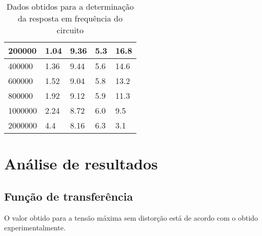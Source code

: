 \documentclass[%
  reprint,
  nofootinbib,
  amsmath,amssymb,
  aps,
  10pt,
  a4paper
]{revtex4-1}
\begin{document}
\begin{table}[h]
\begin{tabular}{|l|l|l|l|l|}
    200000                           	    & 1.04  & 9.36&  5.3	&16.8			\\ \hline
    400000                           	    & 1.36  & 9.44&  5.6	&14.6				\\ \hline
    600000                           	    & 1.52  & 9.04&  5.8	&13.2				\\ \hline
    800000                           	    & 1.92  & 9.12&  5.9	&11.3				\\ \hline
    1000000                          	    & 2.24  & 8.72&  6.0	&9.5				\\ \hline
    2000000				    &4.4     &8.16 &  6.3     &3.1                          \\ \hline
    \end{tabular}
\caption{Dados obtidos para a determinação da resposta em frequência do circuito}
\label{tab:respostafrequencia}
\end{table}






\section{Análise de resultados}
\label{s:aresul}

\subsection{Função de transferência}

O valor obtido para a tensão máxima sem distorção está de acordo com o obtido experimentalmente.
\end{document}
